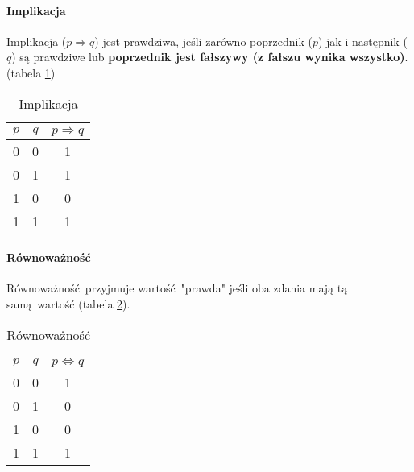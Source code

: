         \paragraph{Implikacja}
        Implikacja ($p \Longrightarrow q$) jest prawdziwa, jeśli zarówno poprzednik ($p$) jak i następnik ($q$) są prawdziwe lub \textbf{poprzednik jest fałszywy (z fałszu wynika wszystko)}. (tabela \ref{tab:implikacja})
        \begin{table}[htbp!]
            \centering
            \caption{Implikacja}
            \label{tab:implikacja}
            \vspace{3mm}
            \begin{tabular}{ccc}
                \textbf{$p$} & \textbf{$q$} & \textbf{$p \Longrightarrow q$} \\
                \midrule
                0 & 0 & 1\\
                0 & 1 & 1\\
                1 & 0 & 0\\
                1 & 1 & 1\\
                \bottomrule
            \end{tabular}
        \end{table}
        
        \paragraph{Równoważność}
        Równoważność przyjmuje wartość "prawda" jeśli oba zdania mają tą samą wartość (tabela \ref{tab:rownowaznosc}).
        \begin{table}[htbp!]
            \centering
            \caption{Równoważność}
            \label{tab:rownowaznosc}
            \vspace{3mm}
            \begin{tabular}{ccc}
                \textbf{$p$} & \textbf{$q$} & \textbf{$p \Leftrightarrow q$} \\
                \midrule
                0 & 0 & 1\\
                0 & 1 & 0\\
                1 & 0 & 0\\
                1 & 1 & 1\\
                \bottomrule
            \end{tabular}
        \end{table}
        
